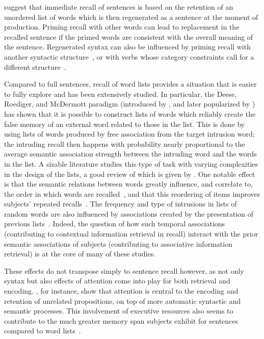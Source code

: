 \begin{new}

\citet{potter_regeneration_1990} suggest that immediate recall of sentences is based on the retention of an unordered list of words which is then regenerated as a sentence at the moment of production.
Priming recall with other words can lead to replacement in the recalled sentence if the primed words are consistent with the overall meaning of the sentence.
Regenerated syntax can also be influenced by priming recall with another syntactic structure~\citep{potter_syntactic_1998}, or with verbs whose category constraints call for a different structure~\citep{lombardi_regeneration_1992}.

Compared to full sentences, recall of word lists provides a situation that is easier to fully explore and has been extensively studied.
In particular, the Deese, Roediger, and McDermott paradigm (introduced by \citealp{deese_prediction_1959}, and later popularized by \citealp{roediger_creating_1995}) has shown that it is possible to construct lists of words which reliably create the false memory of an external word related to those in the list.
This is done by using lists of words produced by free association from the target intrusion word;
the intruding recall then happens with probability nearly proportional to the average semantic association strength between the intruding word and the words in the list.
A sizable literature studies this type of task with varying complexities in the design of the lists, a good review of which is given by \citet{zaromb_temporal_2006}.
One notable effect is that the semantic relations between words greatly influence, and correlate to, the order in which words are recalled~\citep{tulving_subjective_1962,howard_when_2002}, and that this reordering of items improves subjects' repeated recalls~\citep{tulving_subjective_1966}.
The frequency and type of intrusions in lists of random words are also influenced by associations created by the presentation of previous lists~\citep{zaromb_temporal_2006}.
Indeed, the question of how such temporal associations (contributing to contextual information retrieval in recall) interact with the prior semantic associations of subjects (contributing to associative information retrieval) is at the core of many of these studies.

These effects do not transpose simply to sentence recall however, as not only syntax but also effects of attention come into play for both retrieval and encoding.
\citet{jefferies_automatic_2004}, for instance, show that attention is central to the encoding and retention of unrelated propositions, on top of more automatic syntactic and semantic processes.
This involvement of executive resources also seems to contribute to the much greater memory span subjects exhibit for sentences compared to word lists~\citep[see][again, for more details]{jefferies_automatic_2004}.

\end{new}

